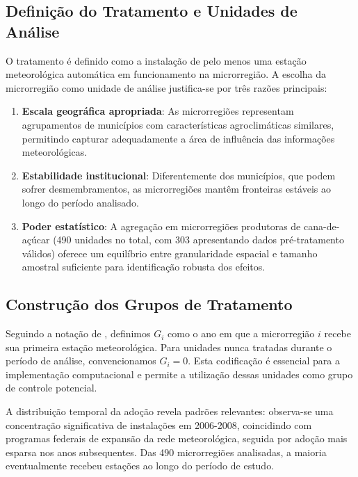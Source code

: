 \documentclass[
	12pt,				%
	oneside,			%
	a4paper,			%
	english,			%
	french,				%
	spanish,			%
	brazil				%
	]{abntex2}
\begin{document}
\subsection{Definição do Tratamento e Unidades de Análise}

O tratamento é definido como a instalação de pelo menos uma estação meteorológica automática em funcionamento na microrregião. A escolha da microrregião como unidade de análise justifica-se por três razões principais:

\begin{enumerate}
\item \textbf{Escala geográfica apropriada}: As microrregiões representam agrupamentos de municípios com características agroclimáticas similares, permitindo capturar adequadamente a área de influência das informações meteorológicas.

\item \textbf{Estabilidade institucional}: Diferentemente dos municípios, que podem sofrer desmembramentos, as microrregiões mantêm fronteiras estáveis ao longo do período analisado.

\item \textbf{Poder estatístico}: A agregação em microrregiões produtoras de cana-de-açúcar (490 unidades no total, com 303 apresentando dados pré-tratamento válidos) oferece um equilíbrio entre granularidade espacial e tamanho amostral suficiente para identificação robusta dos efeitos.
\end{enumerate}

\subsection{Construção dos Grupos de Tratamento}

Seguindo a notação de , definimos $G_i$ como o ano em que a microrregião $i$ recebe sua primeira estação meteorológica. Para unidades nunca tratadas durante o período de análise, convencionamos $G_i = 0$. Esta codificação é essencial para a implementação computacional e permite a utilização dessas unidades como grupo de controle potencial.

A distribuição temporal da adoção revela padrões relevantes: observa-se uma concentração significativa de instalações em 2006-2008, coincidindo com programas federais de expansão da rede meteorológica, seguida por adoção mais esparsa nos anos subsequentes. Das 490 microrregiões analisadas, a maioria eventualmente recebeu estações ao longo do período de estudo.
\end{document}
